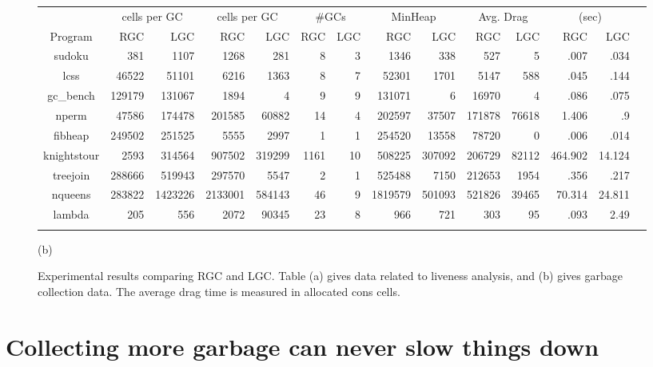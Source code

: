 \documentclass[9pt]{sigplanconf}
\begin{document}
\begin{enumerate}
\begin{figure}[t]
{\begin{tabular}{| c | r | r | r | r | r | r  |  r | r |
r | r | r | r | r |}
                            &   \multicolumn{2}{c|}{cells per GC}
                            &   \multicolumn{2}{c|}{cells per GC}
                            &   \multicolumn{2}{c|}{\#GCs}
                            &   \multicolumn{2}{c|}{MinHeap}
                            &   \multicolumn{2}{c|}{Avg. Drag}
                            &   \multicolumn{2}{c|}{(sec)} \\
\cline{2-13}
{Program}    &
RGC & LGC & RGC & LGC  & RGC & LGC  &   RGC & LGC & RGC & LGC & RGC &
LGC \\
\hline
\hline
    {\sf   sudoku}  &381 &1107 &1268 &281 &8 &3 & 1346  &338 &527 &5
&.007 & .034 \\
    {\sf  lcss } & 46522 &51101 &6216 &1363&8&7& 52301  &1701 &5147
&588 &.045 & .144 \\
    {\sf   gc\_bench}  &129179 &131067 &1894 &4&9&9& 131071   &6 &16970
 &4 &.086 & .075 \\
     {\sf  nperm}  & 47586  &174478 &201585 &60882&14&4& 202597  &37507
&171878 &76618 &1.406 & .9  \\
    {\sf  fibheap} &249502  &251525 &5555 &2997&1&1& 254520  &13558
&78720 &0 &.006 & .014  \\
    {\sf  knightstour}  &2593 &314564 &907502 &319299&1161&10&508225
&307092 &206729 &82112 &464.902 & 14.124  \\
    {\sf  treejoin} & 288666  &519943 &297570 &5547&2&1& 525488  &7150
&212653 &1954 &.356 & .217 \\
    {\sf   nqueens} & 283822 &1423226 &2133001 &584143&46&9& 1819579
&501093 &521826 &39465 &70.314 & 24.811 \\
    {\sf   lambda}  &205 & 556 &2072&90345 &23 &8&966 & 721  &303 &95
&.093 &2.49  \\
\\
 \hline
\end{tabular}}


\centerline{(b)}
\vskip -2mm
\caption{Experimental results comparing RGC and LGC. Table (a) gives
  data related to liveness analysis, and (b) gives garbage collection
  data. The average drag time is measured in allocated cons cells.}
\label{fig:experimental-results}
\normalsize
\end{figure}

\section{Collecting more garbage can never slow things down}
\label{sec:lgc-always-better}


\end{enumerate}
\end{document}
